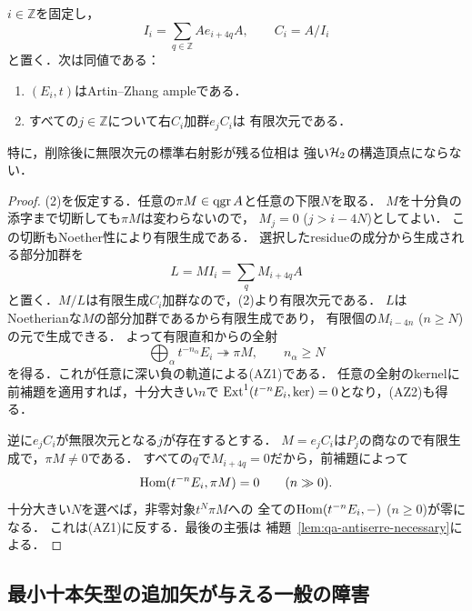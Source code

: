 \begin{theorem}[頂点idealによる反Serre豊富性の必要十分条件]
\label{thm:qa-vertex-ideal-az-criterion}
$i\in\mathbb Z$を固定し，
\[
 I_i=\sum_{q\in\mathbb Z}Ae_{i+4q}A,
 \qquad C_i=A/I_i
\]
と置く．次は同値である：
\begin{enumerate}
\item $(E_i,t)$はArtin--Zhang ampleである．
\item すべての$j\in\mathbb Z$について右$C_i$加群$e_jC_i$は
      有限次元である．
\end{enumerate}
特に，削除後に無限次元の標準右射影が残る位相は
強い$\mathcal H_2$の構造頂点にならない．
\end{theorem}
\begin{proof}
(2)を仮定する．任意の$\pi M\in\operatorname{qgr} A$と任意の下限$N$を取る．
$M$を十分負の添字まで切断しても$\pi M$は変わらないので，
$M_j=0$ ($j>i-4N$)としてよい．
この切断もNoether性により有限生成である．
選択したresidueの成分から生成される部分加群を
\[
 L=MI_i=\sum_q M_{i+4q}A
\]
と置く．$M/L$は有限生成$C_i$加群なので，(2)より有限次元である．
$L$はNoetherianな$M$の部分加群であるから有限生成であり，
有限個の$M_{i-4n}$ ($n\ge N$)の元で生成できる．
よって有限直和からの全射
\[
 \bigoplus_{\alpha}t^{-n_\alpha}E_i\twoheadrightarrow\pi M,
 \qquad n_\alpha\ge N
\]
を得る．これが任意に深い負の軌道による(AZ1)である．
任意の全射のkernelに前補題を適用すれば，十分大きい$n$で
$\operatorname{Ext}^1(t^{-n}E_i,\ker)=0$となり，(AZ2)も得る．

逆に$e_jC_i$が無限次元となる$j$が存在するとする．
$M=e_jC_i$は$P_j$の商なので有限生成で，$\pi M\ne0$である．
すべての$q$で$M_{i+4q}=0$だから，前補題によって
\[
 \operatorname{Hom}(t^{-n}E_i,\pi M)=0\qquad(n\gg0).
\]
十分大きい$N$を選べば，非零対象$t^N\pi M$への
全ての$\operatorname{Hom}(t^{-n}E_i,-)$ ($n\ge0$)が零になる．
これは(AZ1)に反する．最後の主張は
補題~\ref{lem:qa-antiserre-necessary}による．
\end{proof}

\subsection{最小十本矢型の追加矢が与える一般の障害}


